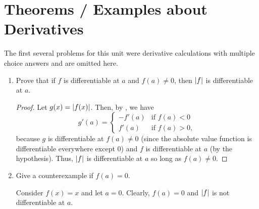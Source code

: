 \section{Theorems / Examples about Derivatives}

\setcounter{problem}{6}

\begin{callout}
  The first several problems for this unit were derivative calculations with multiple choice
  answers and are omitted here.
\end{callout}

\begin{problem}
  \begin{enumerate}[label=(\alph*)]
    \item Prove that if $f$ is differentiable at $a$ and $f(a) \neq 0$, then $\left\lvert f \right\rvert$
      is differentiable at $a$.

      \begin{proof}
        Let $g(x) = \left\lvert f(x) \right\rvert$. Then, by , we have
        \[
          g'(a) = 
          \begin{cases}
            -f'(a) & \text{if } f(a) < 0 \\
            f'(a) & \text{if } f(a) > 0,
          \end{cases}
        \]
        because $g$ is differentiable at $f(a) \neq 0$ (since the absolute
        value function is differentiable everywhere except $0$) and $f$ is
        differentiable at $a$ (by the hypothesis). Thus, $\left\lvert f \right\rvert$ is
        differentiable at $a$ so long as $f(a) \neq 0$.
      \end{proof}

    \item Give a counterexample if $f(a) = 0$.
      \vspace{\baselineskip}

      Consider $f(x) = x$ and let $a = 0$. Clearly, $f(a) = 0$ and $\left\lvert f \right\rvert$ is not differentiable at $a$.
  \end{enumerate}
\end{problem}

